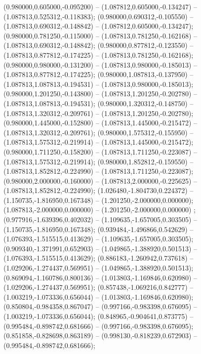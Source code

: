  (0.980000,0.605000,-0.095200) -- (1.087812,0.605000,-0.134247) -- (1.087813,0.525312,-0.118383);
 (0.980000,0.690312,-0.105550) -- (1.087813,0.690312,-0.148842) -- (1.087812,0.605000,-0.134247);
 (0.980000,0.781250,-0.115000) -- (1.087813,0.781250,-0.162168) -- (1.087813,0.690312,-0.148842);
 (0.980000,0.877812,-0.123550) -- (1.087813,0.877812,-0.174225) -- (1.087813,0.781250,-0.162168);
 (0.980000,0.980000,-0.131200) -- (1.087813,0.980000,-0.185013) -- (1.087813,0.877812,-0.174225);
 (0.980000,1.087813,-0.137950) -- (1.087813,1.087813,-0.194531) -- (1.087813,0.980000,-0.185013);
 (0.980000,1.201250,-0.143800) -- (1.087813,1.201250,-0.202780) -- (1.087813,1.087813,-0.194531);
 (0.980000,1.320312,-0.148750) -- (1.087813,1.320312,-0.209761) -- (1.087813,1.201250,-0.202780);
 (0.980000,1.445000,-0.152800) -- (1.087813,1.445000,-0.215472) -- (1.087813,1.320312,-0.209761);
 (0.980000,1.575312,-0.155950) -- (1.087813,1.575312,-0.219914) -- (1.087813,1.445000,-0.215472);
 (0.980000,1.711250,-0.158200) -- (1.087813,1.711250,-0.223087) -- (1.087813,1.575312,-0.219914);
 (0.980000,1.852812,-0.159550) -- (1.087813,1.852812,-0.224990) -- (1.087813,1.711250,-0.223087);
 (0.980000,2.000000,-0.160000) -- (1.087813,2.000000,-0.225625) -- (1.087813,1.852812,-0.224990);
 (1.026480,-1.804730,0.224372) -- (1.150735,-1.816950,0.167348) -- (1.201250,-2.000000,0.000000);
 (1.087813,-2.000000,0.000000) -- (1.201250,-2.000000,0.000000) ;
 (0.977916,-1.639396,0.402032) -- (1.109635,-1.657005,0.303505) -- (1.150735,-1.816950,0.167348);
 (0.939484,-1.496866,0.542629) -- (1.076393,-1.515515,0.413629) -- (1.109635,-1.657005,0.303505);
 (0.909340,-1.371991,0.652903) -- (1.049865,-1.388920,0.501513) -- (1.076393,-1.515515,0.413629);
 (0.886183,-1.260942,0.737618) -- (1.029206,-1.274437,0.569951) -- (1.049865,-1.388920,0.501513);
 (0.869094,-1.160786,0.800136) -- (1.013803,-1.169846,0.620980) -- (1.029206,-1.274437,0.569951);
 (0.857438,-1.069216,0.842777) -- (1.003219,-1.073336,0.656044) -- (1.013803,-1.169846,0.620980);
 (0.850804,-0.984358,0.867047) -- (0.997166,-0.983398,0.676095) -- (1.003219,-1.073336,0.656044);
 (0.848965,-0.904641,0.873775) -- (0.995484,-0.898742,0.681666) -- (0.997166,-0.983398,0.676095);
 (0.851858,-0.828698,0.863189) -- (0.998130,-0.818239,0.672903) -- (0.995484,-0.898742,0.681666);
